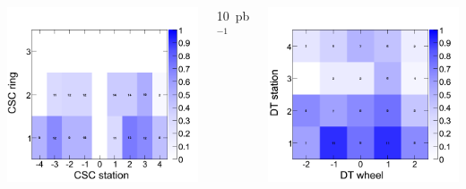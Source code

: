 \documentclass[compress]{beamer}
\begin{document}
\begin{frame}
\begin{columns}
\includegraphics[width=\linewidth]{il05_CSC_fraction.png}


\begin{center}
10~pb$^{-1}$
\end{center}

\vspace{-0.4 cm}
\includegraphics[width=\linewidth]{il10_DT_fraction.png}


\end{columns}
\end{frame}
\end{document}
